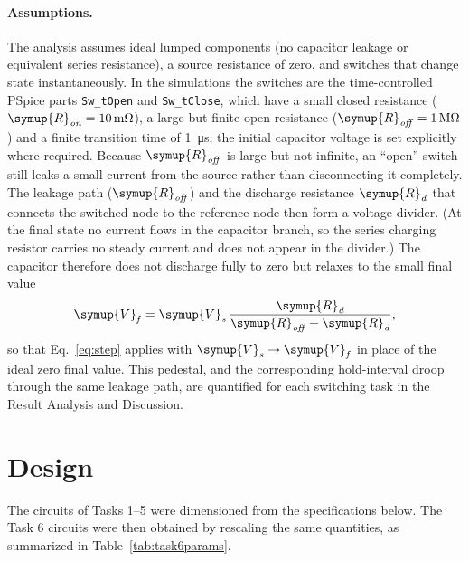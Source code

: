 \documentclass[12pt,a4paper]{article}
\begin{document}
	\paragraph{Assumptions.}
	The analysis assumes ideal lumped components (no capacitor leakage or
	equivalent series resistance), a source resistance of zero, and
	switches that change state instantaneously.  In the simulations the
	switches are the time-controlled PSpice parts \texttt{Sw\_tOpen} and
	\texttt{Sw\_tClose}, which have a small closed resistance
	($\symup{R}_{\mathit{on}} = \SI{10}{\milli\ohm}$), a large but finite open
	resistance ($\symup{R}_{\mathit{off}} = \SI{1}{\mega\ohm}$) and a finite
	transition time of \SI{1}{\micro\second}; the initial capacitor voltage
	is set explicitly where required.  Because $\symup{R}_{\mathit{off}}$ is
	large but not infinite, an ``open'' switch still leaks a small
	current from the source rather than disconnecting it completely.
	The leakage path ($\symup{R}_{\mathit{off}}$) and the discharge resistance
	$\symup{R}_{\mathit{d}}$ that connects the switched node to the reference node
	then form a voltage divider.  (At the final state no current flows in
	the capacitor branch, so the series charging resistor carries no
	steady current and does not appear in the divider.)  The capacitor
	therefore does not discharge fully to zero but relaxes to the small
	final value
	\begin{equation}
		\symup{V}_{\mathit{f}} = \symup{V}_{\mathit{s}}\,\frac{\symup{R}_{\mathit{d}}}{\symup{R}_{\mathit{off}} + \symup{R}_{\mathit{d}}},
		\label{eq:pedestal}
	\end{equation}
	so that Eq.~\eqref{eq:step} applies with $\symup{V}_{\mathit{s}} \to \symup{V}_{\mathit{f}}$ in
	place of the ideal zero final value.  This pedestal, and the
	corresponding hold-interval droop through the same leakage path, are
	quantified for each switching task in the Result Analysis and
	Discussion.
	
	\newpage
	
	\section{Design}
	\label{sec:design}
	The circuits of Tasks 1--5 were dimensioned from the specifications
	below.  The Task 6 circuits were then obtained by rescaling the same
	quantities, as summarized in Table~\ref{tab:task6params}.
	
\end{document}
